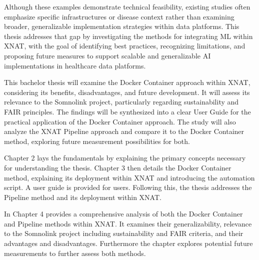 Although these examples demonstrate technical feasibility, existing studies often emphasize specific infrastructures or disease context rather than examining broader, generalizable implementation strategies within data platforms. This thesis addresses that gap by investigating the methods for integrating \ac{ML} within XNAT, with the goal of identifying best practices, recognizing limitations, and proposing future measures to support scalable and generalizable AI implementations in healthcare data platforms.

This bachelor thesis will examine the Docker Container approach within XNAT, considering its benefits, disadvantages, and future development. It will assess its relevance to the Somnolink project, particularly regarding sustainability and FAIR principles. The findings will be synthesized into a clear User Guide for the practical application of the Docker Container approach.
The study will also analyze the XNAT Pipeline approach and compare it to the Docker Container method, exploring future measurement possibilities for both.

Chapter 2 lays the fundamentals by explaining the primary concepts necessary for understanding the thesis. Chapter 3 then details the Docker Container method, explaining its deployment within XNAT and introducing the automation script. A user guide is provided for users. Following this, the thesis addresses the Pipeline method and its deployment within XNAT.

In Chapter 4 provides a comprehensive analysis of both the Docker Container and Pipeline methods within XNAT. It examines their  generalizability, relevance to the Somnolink project including sustainability and FAIR criteria, and their advantages and disadvantages. Furthermore the chapter explores potential future measurements to further assess both methods.



 

